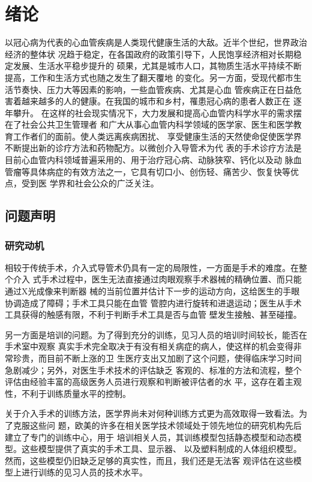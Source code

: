 \chapter{绪\;\;\;论}
\label{chap1}

以冠心病为代表的心血管疾病是人类现代健康生活的大敌。近半个世纪，世界政治经济的整体状
况趋于稳定，在各国政府的政策引导下，人民饱享经济相对长期稳定发展、生活水平稳步提升的
硕果，尤其是城市人口，其物质生活水平持续不断提高，工作和生活方式也随之发生了翻天覆地
的变化。另一方面，受现代都市生活节奏快、压力大等因素的影响，一些血管疾病、尤其是心血
管疾病正在日益危害着越来越多的人的健康。在我国的城市和乡村，罹患冠心病的患者人数正在
逐年攀升\cite{moh2010annual}\cite{moh2008annual}\cite{moh2007annual}\cite{moh2005annual}\cite{moh2004annual}。
在这样的社会现实情况下，大力发展和提高心血管内科学水平的需求摆在了社会公共卫生管理者
和广大从事心血管内科学领域的医学家、医生和医学教育工作者们的面前。使人类远离疾病困扰、
享受健康生活的天然使命促使医学界不断提出新的诊疗方法和药物配方。以微创介入导管术为代
表的手术诊疗方法是目前心血管内科领域普遍采用的、用于治疗冠心病、动脉狭窄、钙化以及动
脉血管瘤等具体病症的有效方法之一，它具有切口小、创伤轻、痛苦少、恢复快等优点，受到医
学界和社会公众的广泛关注。

\section{问题声明}
\label{sec1-1}

\subsection{研究动机}
\label{subsec1-1-1}

相较于传统手术，介入式导管术仍具有一定的局限性，一方面是手术的难度。在整个介入
式手术过程中，医生无法直接通过肉眼观察手术器械的精确位置、而只能通过X光成像来判断器
械的当前位置并估计下一步的运动方向，这给医生的手眼协调造成了障碍；手术工具只能在血管
管腔内进行旋转和进退运动；医生从手术工具获得的触感有限，不利于判断手术工具是否与血管
壁发生接触、甚至碰撞。

另一方面是培训的问题。为了得到充分的训练，见习人员的培训时间较长，能否在手术室中观察
真实手术完全取决于有没有相关病症的病人，使这样的机会变得非常珍贵，而目前不断上涨的卫
生医疗支出又加剧了这个问题，使得临床学习时间急剧减少；另外，对医生手术技术的评估缺乏
客观的、标准的方法和流程，整个评估由经验丰富的高级医务人员进行观察和判断被评估者的水
平，这存在着主观性，不利于训练质量水平的控制。

关于介入手术的训练方法，医学界尚未对何种训练方式更为高效取得一致看法。为了克服这些问
题，欧美的许多在相关医学技术领域处于领先地位的研究机构先后建立了专门的训练中心，用于
培训相关人员，其训练模型包括静态模型和动态模型。这些模型提供了真实的手术工具、显示器、
以及塑料制成的人体组织模型。然而，这些模型仍旧缺乏足够的真实性，而且，我们还是无法客
观评估在这些模型上进行训练的见习人员的技术水平。

